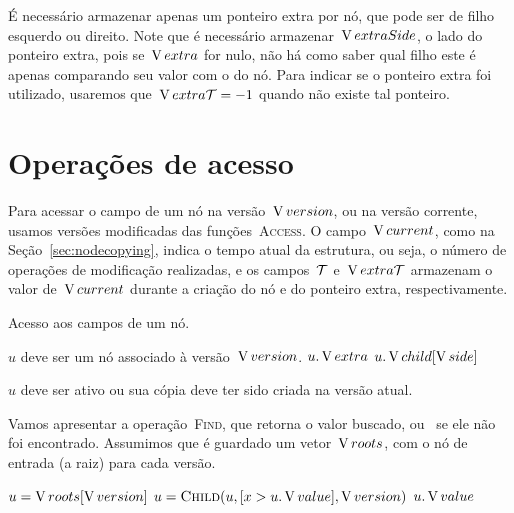 \documentclass[main.tex]{subfiles}
\begin{document}
É necessário armazenar apenas um ponteiro extra por nó, que pode ser de filho esquerdo ou direito. Note que é necessário armazenar~$\operatorname{V}{extraSide}$, o lado do ponteiro extra, pois se~$\operatorname{V}{extra}$ for nulo, não há como saber qual filho este é apenas comparando seu valor com o do nó. Para indicar se o ponteiro extra foi utilizado, usaremos que~$\operatorname{V}{extra\mathcal{T}} = -1$ quando não existe tal ponteiro.

\section{Operações de acesso} \label{sec:rbacesso}

Para acessar o campo de um nó na versão~$\operatorname{V}{version}$, ou na versão corrente, usamos versões modificadas das funções~\textsc{Access}. O campo~$\operatorname{V}{current}$, como na Seção~\ref{sec:nodecopying}, indica o tempo atual da estrutura, ou seja, o número de operações de modificação realizadas, e os campos~$\mathcal{T}$ e~$\operatorname{V}{extra\mathcal{T}}$ armazenam o valor de~$\operatorname{V}{current}$ durante a criação do nó e do ponteiro extra, respectivamente.

\begin{algorithm}
\caption{Acesso aos campos de um nó.}
\begin{algorithmic}[1]

\Require $u$ deve ser um nó associado à versão~$\operatorname{V}{version}$.
		\State \Return $u.\operatorname{V}{extra}$
	\EndIf
	\State \Return $u.\operatorname{V}{child}[\operatorname{V}{side}]$
\EndFunction

\Require $u$ deve ser ativo ou sua cópia deve ter sido criada na versão atual.
\State \Return {} 
\EndFunction

\end{algorithmic}
\end{algorithm}

Vamos apresentar a operação~\textsc{Find}, que retorna o valor buscado, ou~ se ele não foi encontrado. Assumimos que é guardado um vetor~$\operatorname{V}{roots}$, com o nó de entrada (a raiz) para cada versão.

\begin{algorithm}
\begin{algorithmic}[1]

	\State $u = \operatorname{V}{roots}[\operatorname{V}{version}]$
	\State $u = \Call{Child}{u, [x > u.\val], \version}$ \label{line:findrb:iver}
	\EndWhile
		\State \Return \Null
	\Else
		\State \Return $u.\operatorname{V}{value}$ %
	\EndIf
\EndFunction

\end{algorithmic}
\end{algorithm}
\end{document}
